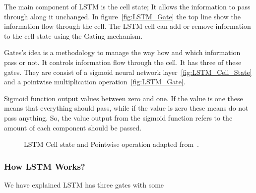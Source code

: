 The main component of LSTM is the cell state; It allows the information to pass through along it unchanged. In figure~\ref{fig:LSTM_Gate} the top line show the information flow through the cell. The LSTM cell can add or remove information to the cell state using the Gating mechanism. 

Gates's idea is a methodology to manage the way how and which information pass or not. It controls information flow through the cell. It has three of these gates. They are consist of a sigmoid neural network layer~\ref{fig:LSTM_Cell_State} and a pointwise multiplication operation~\ref{fig:LSTM_Gate}.

Sigmoid function output values between zero and one. If the value is one these means that everything should pass, while if the value is zero these means do not pass anything. So, the value output from the sigmoid function refers to the amount of each component should be passed.%
\begin{figure}[!t]
  \centering
  \caption{LSTM Cell state and Pointwise operation adapted from~\cite{colah}.}
\end{figure}%
\subsubsection{How LSTM Works?}

We have explained LSTM has three gates with some 

